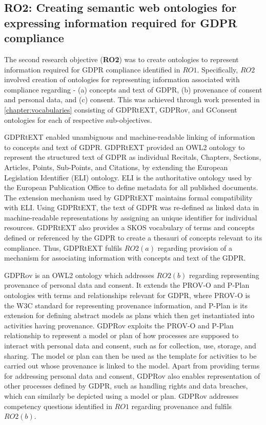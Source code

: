 \subsection*{RO2: Creating semantic web ontologies for expressing information required for GDPR compliance}
The second research objective (\textbf{RO2}) was to create ontologies to represent information required for GDPR compliance identified in $RO1$. Specifically, $RO2$ involved creation of ontologies for representing information associated with compliance regarding - (a)  concepts and text of GDPR, (b) provenance of consent and personal data, and (c) consent. This was achieved through work presented in \autoref{chapter:vocabularies} consisting of GDPRtEXT, GDPRov, and GConsent ontologies for each of respective sub-objectives.

GDPRtEXT enabled unambiguous and machine-readable linking of information to concepts and text of GDPR. GDPRtEXT provided an OWL2 ontology to represent the structured text of GDPR as individual Recitals, Chapters, Sections, Articles, Points, Sub-Points, and Citations, by extending the European Legislation Identifier (ELI) ontology. ELI is the authoritative ontology used by the European Publication Office to define metadata for all published documents. The extension mechanism used by GDPRtEXT maintains formal compatibility with ELI. Using GDPRtEXT, the text of GDPR was re-defined as linked data in machine-readable representations by assigning an unique identifier for individual resources. GDPRtEXT also provides a SKOS vocabulary of terms and concepts defined or referenced by the GDPR to create a thesauri of concepts relevant to its compliance. Thus, GDPRtEXT fulfils $RO2(a)$ regarding provision of a mechanism for associating information with concepts and text of the GDPR.

GDPRov is an OWL2 ontology which addresses $RO2(b)$ regarding representing provenance of personal data and consent. It extends the PROV-O and P-Plan ontologies with terms and relationships relevant for GDPR, where PROV-O is the W3C standard for representing provenance information, and P-Plan is its extension for defining abstract models as plans which then get instantiated into activities having provenance. GDPRov exploits the PROV-O and P-Plan relationship to represent a model or plan of how processes are supposed to interact with personal data and consent, such as for collection, use, storage, and sharing. The model or plan can then be used as the template for activities to be carried out whose provenance is linked to the model. Apart from providing terms for addressing personal data and consent, GDPRov also enables representation of other processes defined by GDPR, such as handling rights and data breaches, which can similarly be depicted using a model or plan. GDPRov addresses competency questions identified in $RO1$ regarding provenance and fulfils $RO2(b)$.

